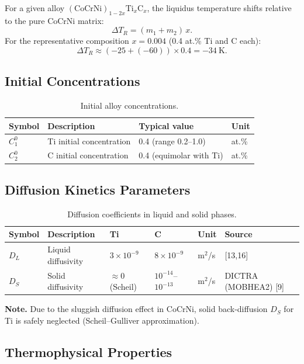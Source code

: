 \documentclass[12pt, a4paper]{article}
\begin{document}
For a given alloy $(\text{CoCrNi})_{1-2x}\text{Ti}_x\text{C}_x$, the liquidus temperature
shifts relative to the pure CoCrNi matrix:
\[
  \Delta T_R = (m_1 + m_2)\,x .
\]
For the representative composition $x = 0.004$ (0.4 at.\% Ti and C each):
\[
  \Delta T_R \approx (-25 + (-60)) \times 0.4 = -34\ \text{K} .
\]

\subsection{Initial Concentrations}

\begin{table}[htbp]
\centering
\caption{Initial alloy concentrations.}
\label{tab:init}
\begin{tabular}{llll}
\toprule
Symbol & Description & Typical value & Unit \\
\midrule
$C_1^0$ & Ti initial concentration & 0.4 (range 0.2--1.0) & at.\% \\
$C_2^0$ & C initial concentration  & 0.4 (equimolar with Ti) & at.\% \\
\bottomrule
\end{tabular}
\end{table}

\subsection{Diffusion Kinetics Parameters}

\begin{table}[htbp]
\centering
\caption{Diffusion coefficients in liquid and solid phases.}
\label{tab:diff}
\begin{tabular}{llllll}
\toprule
Symbol & Description & Ti & C & Unit & Source \\
\midrule
$D_L$ & Liquid diffusivity & $3\times10^{-9}$ & $8\times10^{-9}$ & m$^2$/s & [13,16] \\
$D_S$ & Solid diffusivity  & $\approx 0$ (Scheil) & $10^{-14}$--$10^{-13}$ & m$^2$/s & DICTRA (MOBHEA2) [9] \\
\bottomrule
\end{tabular}
\end{table}

\noindent\textbf{Note.} Due to the sluggish diffusion effect in CoCrNi, solid back-diffusion
$D_S$ for Ti is safely neglected (Scheil--Gulliver approximation).

\subsection{Thermophysical Properties}
\end{document}
